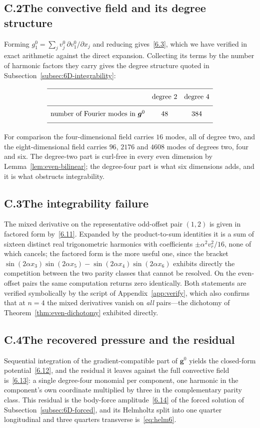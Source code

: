 \documentclass[11pt]{jfm}
\numberwithin{equation}{section}
\begin{document}
\subsection*{C.2\quad The convective field and its degree structure}
Forming $g_1^0=\sum_j v_j^0\,\partial v_1^0/\partial x_j$ and reducing gives~\eqref{6.3}, which we
have verified in exact arithmetic against the direct expansion. Collecting its terms by the number
of harmonic factors they carry gives the degree structure quoted in
Subsection~\ref{subsec:6D-integrability}:
\[
\begin{array}{lcc}
\hline
& \text{degree }2 & \text{degree }4\\
\hline
\text{number of Fourier modes in }\boldsymbol{g}^0 & 48 & 384\\
\hline
\end{array}
\]
For comparison the four-dimensional field carries $16$ modes, all of degree two, and the
eight-dimensional field carries $96$, $2176$ and $4608$ modes of degrees two, four and six. The
degree-two part is curl-free in every even dimension by Lemma~\ref{lem:even-bilinear}; the
degree-four part is what six dimensions adds, and it is what obstructs integrability.

\subsection*{C.3\quad The integrability failure}
The mixed derivative on the representative odd-offset pair $(1,2)$ is given in factored form
by~\eqref{6.11}. Expanded by the product-to-sum identities it is a sum of sixteen distinct real
trigonometric harmonics with coefficients $\pm\alpha^2v_r^2/16$, none of which cancels; the factored form is the more useful
one, since the bracket
$\sin(2\alpha x_3)\sin(2\alpha x_5)-\sin(2\alpha x_4)\sin(2\alpha x_6)$
exhibits directly the competition between the two parity classes that cannot be resolved. On the
even-offset pairs the same computation returns zero identically. Both statements are verified
symbolically by the script of Appendix~\ref{app:verify}, which also confirms that at $n=4$ the
mixed derivatives vanish on \emph{all} pairs---the dichotomy of
Theorem~\ref{thm:even-dichotomy} exhibited directly.

\subsection*{C.4\quad The recovered pressure and the residual}
Sequential integration of the gradient-compatible part of $\boldsymbol{g}^0$ yields the closed-form
potential~\eqref{6.12}, and the residual it leaves against the full convective field
is~\eqref{6.13}: a single degree-four monomial per component, one harmonic in the component's own
coordinate multiplied by three in the complementary parity class. This residual is the body-force
amplitude~\eqref{6.14} of the forced solution of Subsection~\ref{subsec:6D-forced}, and its
Helmholtz split into one quarter longitudinal and three quarters transverse
is~\eqref{eq:helm6}.
\end{document}
